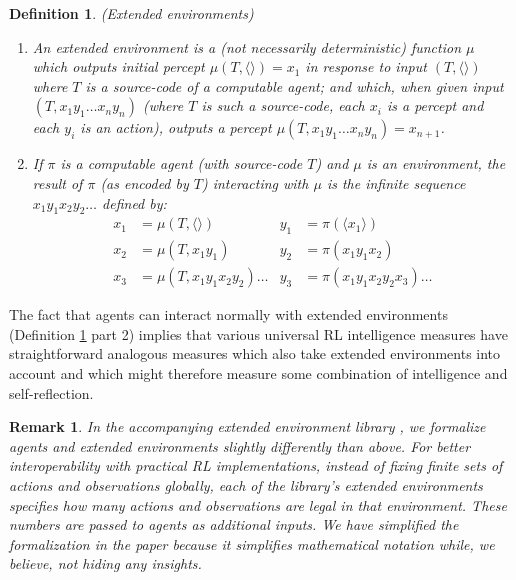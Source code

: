 \documentclass{article}
\newtheorem{myremark}[mytheorem]{Remark}
\newtheorem{mydefinition}[mytheorem]{Definition}
\begin{document}
\begin{mydefinition}
\label{extendedenvironmentsdefn}
(Extended environments)
\begin{enumerate}
  \item
  An \emph{extended environment} is a (not necessarily deterministic)
  function $\mu$ which outputs initial percept $\mu(T,\langle\rangle)=x_1$
  in response to input $(T,\langle\rangle)$ where $T$ is a source-code of a
  computable agent; and which, when given input $(T,x_1y_1\ldots x_ny_n)$ (where
  $T$ is such a source-code, each $x_i$ is a percept and each $y_i$ is
  an action), outputs a percept $\mu(T,x_1y_1\ldots x_ny_n)=x_{n+1}$.
  \item
  If $\pi$ is a computable agent (with source-code $T$)
  and $\mu$ is an environment, the \emph{result of $\pi$ (as encoded by $T$)
  interacting with $\mu$} is the infinite sequence $x_1y_1x_2y_2\ldots$ defined by:
    \begin{align*}
    x_1 &= \mu(T, \langle\rangle) & y_1 &= \pi(\langle x_1\rangle)\\
    x_2 &= \mu(T, x_1y_1) & y_2 &= \pi(x_1y_1x_2)\\
    x_3 &= \mu(T, x_1y_1x_2y_2)\ldots & y_3 &= \pi(x_1y_1x_2y_2x_3) \ldots
  \end{align*}
\end{enumerate}
\end{mydefinition}

The fact that agents can interact normally with extended environments
(Definition \ref{extendedenvironmentsdefn} part 2) implies that various universal
RL intelligence measures
\cite{goertzel2006patterns} \cite{hernandez} \cite{gavane} \cite{legg2007universal}
have straightforward analogous measures which also take
extended environments into account and which might therefore measure some combination
of intelligence and self-reflection.

\begin{myremark}
  In the accompanying extended environment library \cite{library}, we formalize agents
  and extended environments slightly differently than above.
  For better interoperability
  with practical RL implementations, instead of fixing finite
  sets of actions and observations globally, each of the library's extended environments
  specifies how many actions and observations are legal in that environment.
  These numbers are passed to agents as additional inputs.
  We have simplified the formalization in the paper because it simplifies
  mathematical notation while, we believe, not hiding any insights.
\end{myremark}
\end{document}
